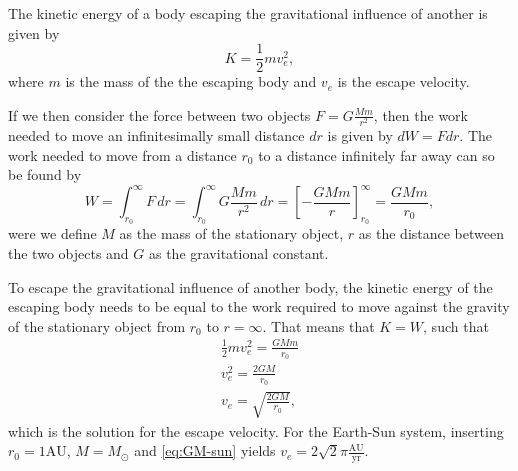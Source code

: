 \documentclass[../main.tex]{subfiles}
\begin{document}
The kinetic energy of a body escaping the gravitational influence of another is given by \begin{equation}
    K = \frac{1}{2} m v_{e}^{2},
\end{equation} where $m$ is the mass of the the escaping body and $v_e$ is the escape velocity. 

If we then consider the force between two objects $F = G \frac{Mm}{r^2}$, then the work needed to move an infinitesimally small distance $dr$ is given by $dW = Fdr$. The work needed to move from a distance $r_0$ to a distance infinitely far away can so be found by 
\begin{equation}
W = \int_{r_0}^{\infty} F\, dr = \int_{r_0}^{\infty} G \frac{Mm}{r^2}\, dr = \left[ -\frac{GMm}{r}  \right]_{r_0}^{\infty} = \frac{GMm}{r_0},
\end{equation} were we define $M$ as the mass of the stationary object, $r$ as the distance between the two objects and $G$ as the gravitational constant.

To escape the gravitational influence of another body, the kinetic energy of the escaping body needs to be equal to the work required to move against the gravity of the stationary object from $r_0$ to $r = \infty$. That means that $K = W$, such that 
\begin{align}
    \frac{1}{2} m v_{e}^{2} = \frac{GMm}{r_0} \\
    v_{e}^{2} = \frac{2GM}{r_0} \\
    v_{e} = \sqrt{\frac{2GM}{r_0}},
    \label{eq:escape-velocity}
\end{align}
which is the solution for the escape velocity. For the Earth-Sun system, inserting $r_0 = 1 \text{AU}$, $M = M_\odot$ and \cref{eq:GM-sun} yields $v_e = 2\sqrt{2} \pi\frac{\text{AU}}{\text{yr}}$.

\iffalse
We are tasked with finding the initial velocity that will let a planet 1AU from the sun escape the sun. This initial velocity needs either to be equal to or bigger than the escape velocity to escape the sun, or it can be smaller, but then it would have to have an elliptical orbit that would speed it up enough to reach the escape velocity, if such a thing is possible. Either way, a velocity equal to the escape velocity at some point in orbit will guarantee an escape from the suns influence.
We need not consider the effects of the other planets on our escaping body, as the speed needed to escape the suns influence would be bigger than any contributions from the other planets. Ans should be about 40km/s
Can also be derived by setting K = U
\fi
\end{document}
